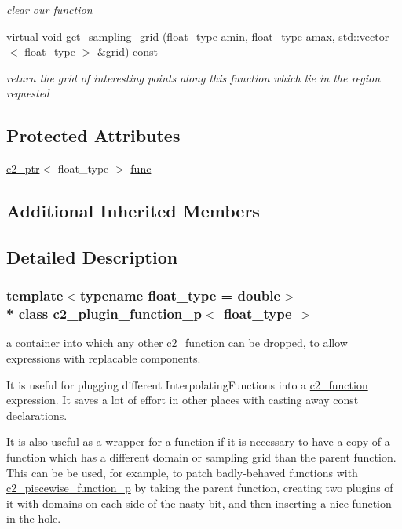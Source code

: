 \begin{DoxyCompactItemize}
\begin{DoxyCompactList}\small\item\em clear our function \end{DoxyCompactList}\item 
virtual void \hyperlink{classc2__plugin__function__p_a0e7ff48329a648b3966efba72b15e3ed}{get\+\_\+sampling\+\_\+grid} (float\+\_\+type amin, float\+\_\+type amax, std\+::vector$<$ float\+\_\+type $>$ \&grid) const 
\begin{DoxyCompactList}\small\item\em return the grid of \textquotesingle{}interesting\textquotesingle{} points along this function which lie in the region requested \end{DoxyCompactList}\end{DoxyCompactItemize}
\subsection*{Protected Attributes}
\begin{DoxyCompactItemize}
\item 
\hyperlink{classc2__ptr}{c2\+\_\+ptr}$<$ float\+\_\+type $>$ \hyperlink{classc2__plugin__function__p_a9f3ca0419f50aa9792da2a9b54716849}{func}
\end{DoxyCompactItemize}
\subsection*{Additional Inherited Members}


\subsection{Detailed Description}
\subsubsection*{template$<$typename float\+\_\+type = double$>$\\*
class c2\+\_\+plugin\+\_\+function\+\_\+p$<$ float\+\_\+type $>$}

a container into which any other \hyperlink{classc2__function}{c2\+\_\+function} can be dropped, to allow expressions with replacable components.

It is useful for plugging different Interpolating\+Functions into a \hyperlink{classc2__function}{c2\+\_\+function} expression. It saves a lot of effort in other places with casting away const declarations. 

It is also useful as a wrapper for a function if it is necessary to have a copy of a function which has a different domain or sampling grid than the parent function. This can be be used, for example, to patch badly-\/behaved functions with \hyperlink{classc2__piecewise__function__p}{c2\+\_\+piecewise\+\_\+function\+\_\+p} by taking the parent function, creating two plugins of it with domains on each side of the nasty bit, and then inserting a nice function in the hole.

